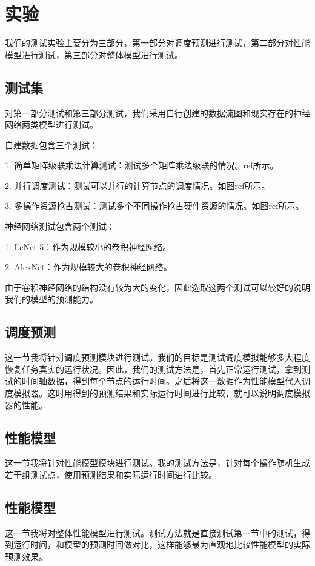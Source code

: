\chapter{实验}
\label{cha:eval}
    我们的测试实验主要分为三部分，第一部分对调度预测进行测试，第二部分对性能模型进行测试，第三部分对整体模型进行测试。
    
\section{测试集}
    对第一部分测试和第三部分测试，我们采用自行创建的数据流图和现实存在的神经网络两类模型进行测试。
    
    自建数据包含三个测试：
    
    1. 简单矩阵级联乘法计算测试：测试多个矩阵乘法级联的情况。ref所示。
    
    2. 并行调度测试：测试可以并行的计算节点的调度情况。如图ref所示。

    3. 多操作资源抢占测试：测试多个不同操作抢占硬件资源的情况。如图ref所示。

    神经网络测试包含两个测试：
    
    1. LeNet-5：作为规模较小的卷积神经网络。
    
    2. AlexNet：作为规模较大的卷积神经网络。
    
    由于卷积神经网络的结构没有较为大的变化，因此选取这两个测试可以较好的说明我们的模型的预测能力。

\section{调度预测}
    这一节我将针对调度预测模块进行测试。我们的目标是测试调度模拟能够多大程度恢复任务真实的运行状况。因此，我们的测试方法是，首先正常运行测试，拿到测试的时间轴数据，得到每个节点的运行时间。之后将这一数据作为性能模型代入调度模拟器。这时用得到的预测结果和实际运行时间进行比较，就可以说明调度模拟器的性能。
    
\section{性能模型}
    这一节我将针对性能模型模块进行测试。我的测试方法是，针对每个操作随机生成若干组测试点，使用预测结果和实际运行时间进行比较。
    
\section{性能模型}
    这一节我将对整体性能模型进行测试。测试方法就是直接测试第一节中的测试，得到运行时间，和模型的预测时间做对比，这样能够最为直观地比较性能模型的实际预测效果。

